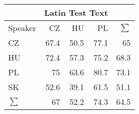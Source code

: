 \begin{tabular}{l|rrr|r}
\hline
 & \multicolumn{3}{c}{Latin Test Text} & \\
\hline
 Speaker   &   CZ &   HU &   PL &   $\sum$ \\
\hline
 CZ        & 67.4 & 50.5 & 77.1 &     65   \\
 HU        & 72.4 & 57.3 & 75.2 &     68.3 \\
 PL        & 75   & 63.6 & 80.7 &     73.1 \\
 SK        & 52.6 & 39.1 & 61.5 &     51.1 \\
\hline
 $\sum$   & 67   & 52.2 & 74.3 &     64.5 \\
\hline
\end{tabular}